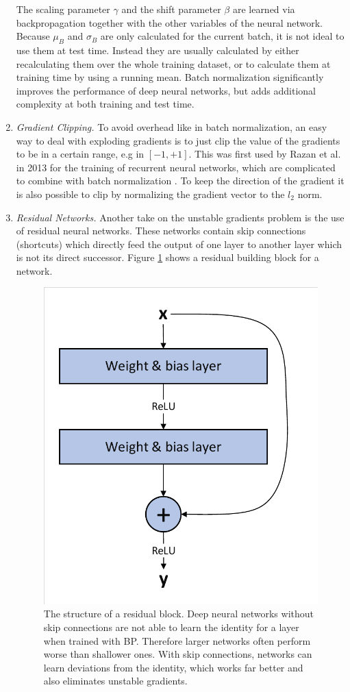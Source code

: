 \begin{enumerate}
  The scaling parameter $\gamma$ and the shift parameter $\beta$ are learned via backpropagation together with the other variables of the neural network. Because $\mu_B$ and $\sigma_B$ are only calculated for the current batch, it is not ideal to use them at test time. Instead they are usually calculated by either recalculating them over the whole training dataset, or to calculate them at training time by using a running mean. Batch normalization significantly improves the performance of deep neural networks, but adds additional complexity at both training and test time.
  \item \textit{Gradient Clipping.} To avoid overhead like in batch normalization, an easy way to deal with exploding gradients is to just clip the value of the gradients to be in a certain range, e.g in $[-1, +1]$. This was first used by Razan et al. in 2013 for the training of recurrent neural networks, which are complicated to combine with batch normalization \cite{pascanu2013difficulty}. To keep the direction of the gradient it is also possible to clip by normalizing the gradient vector to the $l_2$ norm.
  \item \textit{Residual Networks.} Another take on the unstable gradients problem is the use of residual neural networks. These networks contain skip connections (shortcuts) which directly feed the output of one layer to another layer which is not its direct successor. Figure \ref{fig:ResidualBlock} shows a residual building block for a network. 
  
  \begin{figure}[t]
    
    \begin{center}
        \includegraphics[clip, trim=10px 10px 10px 10px, width=0.4\columnwidth]{figures/deeplearning/Residual_Block.pdf}
    \end{center}
    
    \caption[Residual Block]{The structure of a residual block. Deep neural networks without skip connections are not able to learn the identity for a layer when trained with BP. Therefore larger networks often perform worse than shallower ones. With skip connections, networks can learn deviations from the identity, which works far better and also eliminates unstable gradients.}
    \label{fig:ResidualBlock}
  \end{figure}


\end{enumerate}
